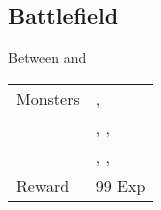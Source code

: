 \subsection{Battlefield}
\label{map:battlefield_08}

Between  and 

\begin{longtable}{ l p{9cm} }
	Monsters
	& \nameref{monster:edgehog}, \nameref{monster:edgehog} \\
	& \nameref{monster:edgehog}, \nameref{monster:edgehog}, \nameref{monster:scorpion} \\
	& \nameref{monster:scorpion}, \nameref{monster:scorpion}, \nameref{monster:giant_toad}
\\
	Reward & 99 Exp
\end{longtable}
